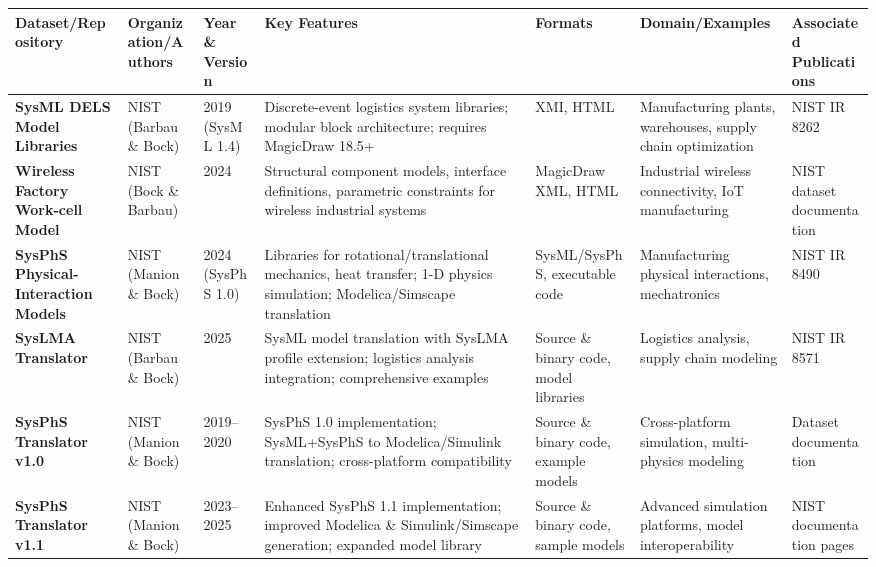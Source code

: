 \documentclass[11pt,a4paper]{article}
\begin{document}
\begin{longtable}{L{3cm}L{2.2cm}L{1.8cm}L{3.5cm}L{2cm}L{2.5cm}L{3cm}}
\toprule
\textbf{Dataset/Repository} & \textbf{Organization/Authors} & \textbf{Year \& Version} & \textbf{Key Features} & \textbf{Formats} & \textbf{Domain/Examples} & \textbf{Associated Publications} \\
\midrule
\endhead

\textbf{SysML DELS Model Libraries} & 
NIST (Barbau \& Bock) & 
2019 (SysML 1.4) & 
Discrete-event logistics system libraries; modular block architecture; requires MagicDraw 18.5+ & 
XMI, HTML & 
Manufacturing plants, warehouses, supply chain optimization & 
NIST IR 8262 \\

\textbf{Wireless Factory Work-cell Model} & 
NIST (Bock \& Barbau) & 
2024 & 
Structural component models, interface definitions, parametric constraints for wireless industrial systems & 
MagicDraw XML, HTML & 
Industrial wireless connectivity, IoT manufacturing & 
NIST dataset documentation \\

\textbf{SysPhS Physical-Interaction Models} & 
NIST (Manion \& Bock) & 
2024 (SysPhS 1.0) & 
Libraries for rotational/translational mechanics, heat transfer; 1-D physics simulation; Modelica/Simscape translation & 
SysML/SysPhS, executable code & 
Manufacturing physical interactions, mechatronics & 
NIST IR 8490 \\

\textbf{SysLMA Translator} & 
NIST (Barbau \& Bock) & 
2025 & 
SysML model translation with SysLMA profile extension; logistics analysis integration; comprehensive examples & 
Source \& binary code, model libraries & 
Logistics analysis, supply chain modeling & 
NIST IR 8571 \\

\textbf{SysPhS Translator v1.0} & 
NIST (Manion \& Bock) & 
2019--2020 & 
SysPhS 1.0 implementation; SysML+SysPhS to Modelica/Simulink translation; cross-platform compatibility & 
Source \& binary code, example models & 
Cross-platform simulation, multi-physics modeling & 
Dataset documentation \\

\textbf{SysPhS Translator v1.1} & 
NIST (Manion \& Bock) & 
2023--2025 & 
Enhanced SysPhS 1.1 implementation; improved Modelica \& Simulink/Simscape generation; expanded model library & 
Source \& binary code, sample models & 
Advanced simulation platforms, model interoperability & 
NIST documentation pages \\


\end{longtable}
\end{document}
